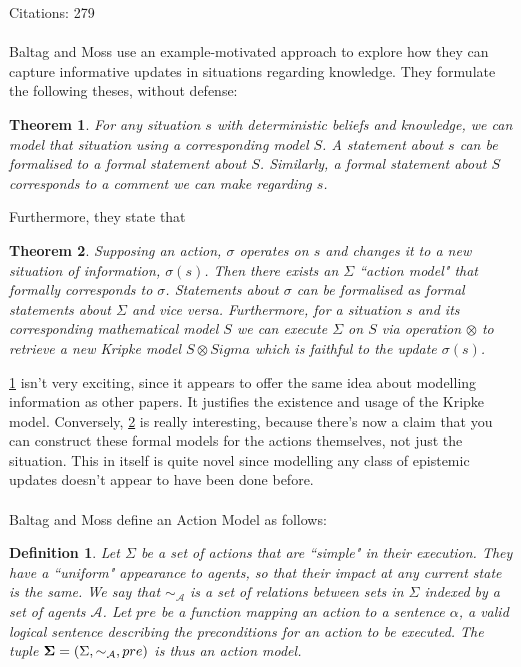 \documentclass[10pt, a4paper, twoside]{article}
\newcommand{\aRel}[1] {
  \sim_{\mathcal{#1} }
}
\newcommand{\actModel}[3]{
  (#1, \aRel{#2}, #3)
}
\newtheorem{defn}{Definition}
\newtheorem{thm}{Theorem}
\begin{document}
Citations: 279\\
\\
Baltag and Moss use an example-motivated approach to explore how they can
capture informative updates in situations regarding knowledge.
They formulate the following theses, without defense:
\begin{thm}\label{situationModel}
For any situation $s$ with deterministic beliefs and knowledge, we can model
that situation using a corresponding model $S$.
A statement about $s$ can be formalised to a formal statement about $S$.
Similarly, a formal statement about $S$ corresponds to a comment we can make
regarding $s$.
\end{thm}
Furthermore, they state that
\begin{thm}\label{actionModelExists}
Supposing an action, $\sigma$ operates on $s$ and changes it to a new situation
of information, $\sigma(s)$.
Then there exists an $\Sigma$ ``action model" that formally corresponds to
$\sigma$.
Statements about $\sigma$ can be formalised as formal statements about $\Sigma$
and vice versa.
Furthermore, for a situation $s$ and its corresponding mathematical model $S$ we
can execute $\Sigma$ on $S$ via operation $\otimes$ to retrieve a new Kripke
model $S \otimes Sigma$ which is faithful to the update $\sigma(s)$.
\end{thm}
\ref{situationModel} isn't very exciting, since it appears to offer the same
idea about modelling information as other papers.
It justifies the existence and usage of the Kripke model.
Conversely, \ref{actionModelExists} is really interesting, because there's now
a claim that you can construct these formal models for the actions themselves,
not just the situation.
This in itself is quite novel since modelling any class of epistemic updates
doesn't appear to have been done before.\\
\\
Baltag and Moss define an Action Model as follows:
\begin{defn}
Let $\Sigma$ be a set of actions that are ``simple" in their execution.
They have a ``uniform" appearance to agents, so that their impact at any current
state is the same.
We say that $\aRel{A}$ is a set of relations between sets in $\Sigma$ indexed
by a set of agents $\mathcal{A}$.
Let $pre$ be a function mapping an action to a sentence $\alpha$, a valid
logical sentence describing the preconditions for an action to be executed.
The tuple ${\bf \Sigma} = \actModel{\Sigma}{A}{pre}$ is thus an action model.
\end{defn}
\end{document}
